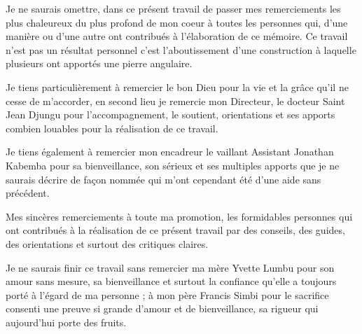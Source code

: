Je ne saurais omettre, dans ce présent travail de passer mes remerciements les plus chaleureux du plus profond de mon coeur à toutes les personnes qui, d'une manière ou d'une autre ont contribués à l'élaboration de ce mémoire. Ce travail n'est pas un résultat personnel c'est l'aboutissement d'une construction à laquelle plusieurs ont apportés une pierre angulaire. 

Je tiens particulièrement à remercier le bon Dieu pour la vie et la grâce qu'il ne cesse de m'accorder, en second lieu je remercie mon Directeur, le docteur Saint Jean Djungu pour l'accompagnement, le soutient, orientations et ses apports combien louables pour la réalisation de ce travail.

Je tiens également à remercier mon encadreur le vaillant Assistant Jonathan Kabemba pour sa bienveillance, son sérieux et ses multiples apports que je ne saurais décrire de façon nommée qui m'ont cependant été d'une aide sans précédent.

Mes sincères remerciements à toute ma promotion, les formidables personnes qui ont contribués à la réalisation de ce présent travail par des conseils, des guides, des orientations et surtout des critiques claires.

Je ne saurais finir ce travail sans remercier ma mère Yvette Lumbu pour son amour sans mesure, sa bienveillance et surtout la confiance qu'elle a toujours porté à l'égard de ma personne ; à mon père Francis Simbi pour le sacrifice consenti une preuve si grande d'amour et de bienveillance, sa rigueur qui aujourd'hui porte des fruits.